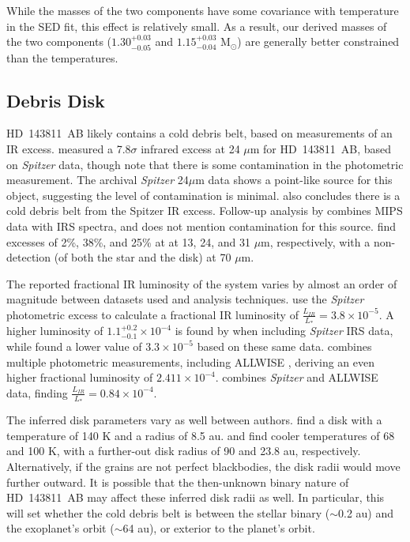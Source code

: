 \documentclass[]{aastex701} %
\begin{document}
While the masses of the two components have some covariance with temperature in the SED fit, this effect is relatively small. As a result, our derived masses of the two components ($1.30^{+0.03}_{-0.05}$ and $1.15^{+0.03}_{-0.04}$ M$_\odot$) are generally better constrained than the temperatures.

\subsection{Debris Disk}

HD~143811~AB likely contains a cold debris belt, based on measurements of an IR excess. \citet{chen:2011} measured a 7.8$\sigma$ infrared excess at 24 $\mu$m for HD~143811~AB, based on \textit{Spitzer} data, though note that there is some contamination in the photometric measurement. The archival \textit{Spitzer} 24$\mu$m data shows a point-like source for this object, suggesting the level of contamination is minimal. \citet{ballering:2013} also concludes there is a cold debris belt from the Spitzer IR excess. Follow-up analysis by \citet{chen:2014} combines MIPS data with IRS spectra, and does not mention contamination for this source.  \citet{chen:2014} find excesses of 2\%, 38\%, and 25\% at at 13, 24, and 31 $\mu$m, respectively, with a non-detection (of both the star and the disk) at 70 $\mu$m.

The reported fractional IR luminosity of the system varies by almost an order of magnitude between datasets used and analysis techniques. \citet{chen:2011} use the \textit{Spitzer} photometric excess to calculate a fractional IR luminosity of $\frac{L_{IR}}{L_*} = 3.8 \times 10^{-5}$. A higher luminosity of $1.1^{+0.2}_{-0.1} \times 10^{-4}$ is found by \citet{chen:2014} when including \textit{Spitzer} IRS data, while \citet{jangcondell:2015} found a lower value of $3.3 \times 10^{-5}$ based on these same data. \citet{mcdonald:2012} combines multiple photometric measurements, including ALLWISE \citep{wright:2010}, deriving an even higher fractional luminosity of $2.411 \times 10^{-4}$. \citet{cotten:2016} combines \textit{Spitzer} and ALLWISE data, finding $\frac{L_{IR}}{L_*} = 0.84 \times 10^{-4}$.  

The inferred disk parameters vary as well between authors. \citet{cotten:2016} find a disk with a temperature of 140 K and a radius of 8.5 au. \citet{chen:2011} and \citet{chen:2014} find cooler temperatures of 68 and 100 K, with a further-out disk radius of 90 and 23.8 au, respectively. Alternatively, if the grains are not perfect blackbodies, the disk radii would move further outward. It is possible that the then-unknown binary nature of HD~143811~AB may affect these inferred disk radii as well. In particular, this will set whether the cold debris belt is between the stellar binary ($\sim$0.2 au) and the exoplanet's orbit ($\sim$64 au), or exterior to the planet's orbit.
\end{document}

